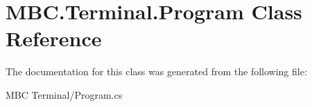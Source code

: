 \hypertarget{class_m_b_c_1_1_terminal_1_1_program}{\section{M\-B\-C.\-Terminal.\-Program Class Reference}
\label{class_m_b_c_1_1_terminal_1_1_program}
}


The documentation for this class was generated from the following file\-:\begin{DoxyCompactItemize}
\item 
M\-B\-C Terminal/Program.\-cs\end{DoxyCompactItemize}
